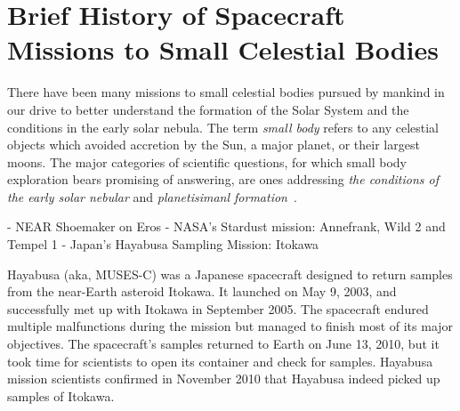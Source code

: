 \cite{Marks2022}



%


\section{Brief History of Spacecraft Missions to Small Celestial Bodies}

There have been many missions to small celestial bodies pursued by mankind in
our drive to better understand the formation of the Solar System and the
conditions in the early solar nebula. The term \textit{small body} refers to any
celestial objects which avoided accretion by the Sun, a major planet, or their
largest moons. The major categories of scientific questions, for which
small body exploration bears promising of answering, are ones addressing
\textit{the conditions of the early solar nebular} and \textit{planetisimanl
    formation}~\cite{Davidsson2021}.

- NEAR Shoemaker on Eros
- NASA's Stardust mission: Annefrank, Wild 2 and Tempel 1
- Japan's Hayabusa Sampling Mission: Itokawa

Hayabusa (aka, MUSES-C) was a Japanese spacecraft designed to return samples
from the near-Earth asteroid Itokawa. It launched on May 9, 2003, and
successfully met up with Itokawa in September 2005. The spacecraft endured
multiple malfunctions during the mission but managed to finish most of its major
objectives. The spacecraft's samples returned to Earth on June 13, 2010, but it
took time for scientists to open its container and check for samples. Hayabusa
mission scientists confirmed in November 2010 that Hayabusa indeed picked up
samples of Itokawa.

